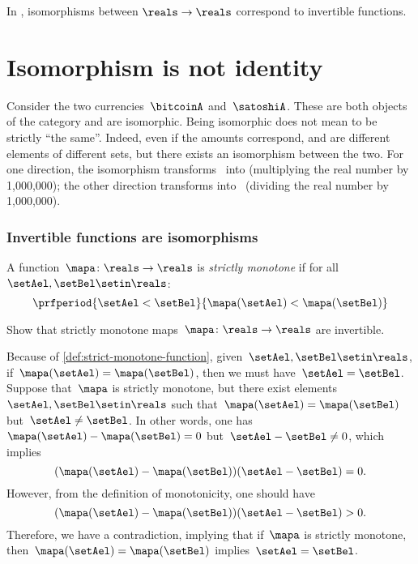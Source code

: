 \begin{example}
    In \Set, isomorphisms between $\reals\to \reals$ correspond to invertible functions.
\end{example}

\section{Isomorphism is not identity}
\begin{example}
    Consider the two currencies~$\bitcoinA$ and~$\satoshiA$.
    These are both objects of the category \Curr and are isomorphic.
    Being isomorphic does not mean to be strictly ``the same''.
    Indeed, even if the amounts correspond, \unit[1]{\bitcoinA} and \unit[1,000,000]{\satoshiA} are different elements of different sets, but there exists an isomorphism between the two.
    For one direction, the isomorphism transforms \bitcoinA \ into \satoshiA (multiplying the real number by 1,000,000);
    the other direction transforms \satoshiA into \bitcoinA \ (dividing the real number by 1,000,000).
\end{example}

\subsubsection{Invertible functions are isomorphisms}
\begin{definition}
    \label{def:strict-monotone-function}
    A function~$\mapa\colon \reals \to \reals$ is \emph{strictly monotone} if for all~$\setAel,\setBel\setin \reals$:
    \begin{equation*}
        \prfperiod{\setAel < \setBel}{\mapa(\setAel)<\mapa(\setBel)}
    \end{equation*}
\end{definition}
\begin{exercise}
    Show that strictly monotone maps~$\mapa\colon \reals \to \reals$ are invertible.
\end{exercise}
\begin{solution}
    Because of \cref{def:strict-monotone-function}, given~$\setAel,\setBel\setin \reals$, if~$\mapa(\setAel)=\mapa(\setBel)$, then we must have~$\setAel=\setBel$.
    Suppose that~$\mapa$ is strictly monotone, but there exist elements~$\setAel,\setBel\setin \reals$ such that~$\mapa(\setAel)=\mapa(\setBel)$ but~$\setAel\neq \setBel$.
    In other words, one has~$\mapa(\setAel)-\mapa(\setBel)=0$ but~$\setAel-\setBel\neq 0$, which implies
    \begin{equation*}
        (\mapa(\setAel)-\mapa(\setBel))(\setAel-\setBel)=0.
    \end{equation*}
    However, from the definition of monotonicity, one should have
    \begin{equation*}
        (\mapa(\setAel)-\mapa(\setBel))(\setAel-\setBel)>0.
    \end{equation*}
    Therefore, we have a contradiction, implying that if~$\mapa$ is strictly monotone, then~$\mapa(\setAel)=\mapa(\setBel)$ implies~$\setAel=\setBel$.
\end{solution}

